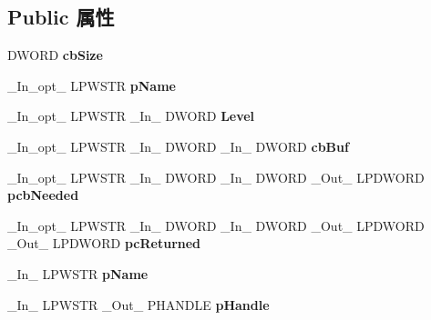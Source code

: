 \subsection*{Public 属性}
\begin{DoxyCompactItemize}
\item 
\mbox{\label{struct___m_o_n_i_t_o_r2_ad186c2e2fca72c2a1fb5e70e9fc8a821}} 
D\+W\+O\+RD {\bfseries cb\+Size}
\item 
\mbox{\label{struct___m_o_n_i_t_o_r2_a95ae347f1f1c6335b4d649230b80c956}} 
\+\_\+\+In\+\_\+opt\+\_\+ L\+P\+W\+S\+TR {\bfseries p\+Name}
\item 
\mbox{\label{struct___m_o_n_i_t_o_r2_a8963922c2d74fbba9545375608275f9f}} 
\+\_\+\+In\+\_\+opt\+\_\+ L\+P\+W\+S\+TR \+\_\+\+In\+\_\+ D\+W\+O\+RD {\bfseries Level}
\item 
\mbox{\label{struct___m_o_n_i_t_o_r2_a587b588d1b660e0330de0dc0e8bee410}} 
\+\_\+\+In\+\_\+opt\+\_\+ L\+P\+W\+S\+TR \+\_\+\+In\+\_\+ D\+W\+O\+RD \+\_\+\+In\+\_\+ D\+W\+O\+RD {\bfseries cb\+Buf}
\item 
\mbox{\label{struct___m_o_n_i_t_o_r2_a63719da4ea3aafa63b87a6a24df96a31}} 
\+\_\+\+In\+\_\+opt\+\_\+ L\+P\+W\+S\+TR \+\_\+\+In\+\_\+ D\+W\+O\+RD \+\_\+\+In\+\_\+ D\+W\+O\+RD \+\_\+\+Out\+\_\+ L\+P\+D\+W\+O\+RD {\bfseries pcb\+Needed}
\item 
\mbox{\label{struct___m_o_n_i_t_o_r2_a07c527a949f36b58f9b4d1fc72aded11}} 
\+\_\+\+In\+\_\+opt\+\_\+ L\+P\+W\+S\+TR \+\_\+\+In\+\_\+ D\+W\+O\+RD \+\_\+\+In\+\_\+ D\+W\+O\+RD \+\_\+\+Out\+\_\+ L\+P\+D\+W\+O\+RD \+\_\+\+Out\+\_\+ L\+P\+D\+W\+O\+RD {\bfseries pc\+Returned}
\item 
\mbox{\label{struct___m_o_n_i_t_o_r2_a95ae347f1f1c6335b4d649230b80c956}} 
\+\_\+\+In\+\_\+ L\+P\+W\+S\+TR {\bfseries p\+Name}
\item 
\mbox{\label{struct___m_o_n_i_t_o_r2_ac4184cdb3b292ec7b90617456a68c399}} 
\+\_\+\+In\+\_\+ L\+P\+W\+S\+TR \+\_\+\+Out\+\_\+ P\+H\+A\+N\+D\+LE {\bfseries p\+Handle}
\item 

\end{DoxyCompactItemize}

